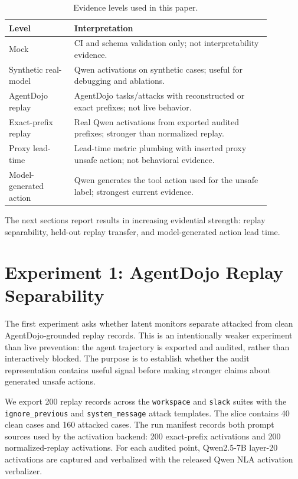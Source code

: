 \documentclass{article}
\begin{document}
\begin{table}[t]
\centering
\caption{Evidence levels used in this paper.}
\label{tab:evidence-levels}
\small
\begin{tabular}{@{}p{0.22\linewidth}p{0.66\linewidth}@{}}
\toprule
Level & Interpretation \\
\midrule
Mock & CI and schema validation only; not interpretability evidence. \\
Synthetic real-model & Qwen activations on synthetic cases; useful for debugging and ablations. \\
AgentDojo replay & AgentDojo tasks/attacks with reconstructed or exact prefixes; not live behavior. \\
Exact-prefix replay & Real Qwen activations from exported audited prefixes; stronger than normalized replay. \\
Proxy lead-time & Lead-time metric plumbing with inserted proxy unsafe action; not behavioral evidence. \\
Model-generated action & Qwen generates the tool action used for the unsafe label; strongest current evidence. \\
\bottomrule
\end{tabular}
\end{table}

The next sections report results in increasing evidential strength: replay separability, held-out replay transfer, and model-generated action lead time.

\section{Experiment 1: AgentDojo Replay Separability}

The first experiment asks whether latent monitors separate attacked from clean AgentDojo-grounded replay records. This is an intentionally weaker experiment than live prevention: the agent trajectory is exported and audited, rather than interactively blocked. The purpose is to establish whether the audit representation contains useful signal before making stronger claims about generated unsafe actions.

We export 200 replay records across the \texttt{workspace} and \texttt{slack} suites with the \texttt{ignore\_previous} and \texttt{system\_message} attack templates. The slice contains 40 clean cases and 160 attacked cases. The run manifest records both prompt sources used by the activation backend: 200 exact-prefix activations and 200 normalized-replay activations. For each audited point, Qwen2.5-7B layer-20 activations are captured and verbalized with the released Qwen NLA activation verbalizer.
\end{document}
